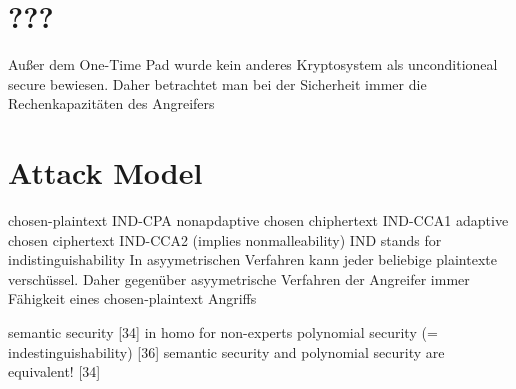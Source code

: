 \section{???}
Außer dem One-Time Pad wurde kein anderes Kryptosystem als unconditioneal secure bewiesen. Daher betrachtet man bei der Sicherheit immer die Rechenkapazitäten des Angreifers

\section{Attack Model}
chosen-plaintext IND-CPA
nonapdaptive chosen chiphertext IND-CCA1
adaptive chosen ciphertext IND-CCA2 (implies nonmalleability)
IND stands for indistinguishability
In asyymetrischen Verfahren kann jeder beliebige plaintexte verschüssel. Daher gegenüber asyymetrische Verfahren der Angreifer immer Fähigkeit eines chosen-plaintext Angriffs

semantic security [34] in homo for non-experts
polynomial security (= indestinguishability) [36]
semantic security and polynomial security are equivalent! [34]